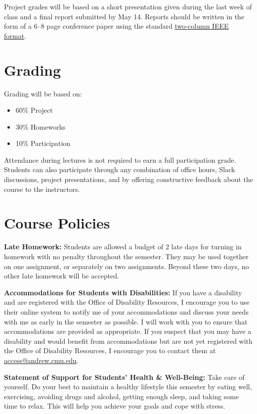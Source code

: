 \documentclass[11pt,letterpaper]{article}
\begin{document}
\medskip
\noindent
Project grades will be based on a short presentation given during the last week of class and a final report submitted by May 14. Reports should be written in the form of a 6--8 page conference paper using the standard \href{https://www.ieee.org/conferences/publishing/templates.html}{two-column IEEE format}.

\section*{Grading}

Grading will be based on:
\begin{itemize}
	\item 60\% Project
	\item 30\% Homeworks
	\item 10\% Participation
\end{itemize}
Attendance during lectures is not required to earn a full participation grade. Students can also participate through any combination of office hours, Slack discussions, project presentations, and by offering constructive feedback about the course to the instructors.


\section*{Course Policies}

\textbf{Late Homework:} Students are allowed a budget of 2 late days for turning in homework with no penalty throughout the semester. They may be used together on one assignment, or separately on two assignments. Beyond these two days, no other late homework will be accepted.

\medskip
\noindent
\textbf{Accommodations for Students with Disabilities:} If you have a disability and are registered with the Office of Disability Resources, I encourage you to use their online system to notify me of your accommodations and discuss your needs with me as early in the semester as possible. I will work with you to ensure that accommodations are provided as appropriate. If you suspect that you may have a disability and would benefit from accommodations but are not yet registered with the Office of Disability Resources, I encourage you to contact them at \href{mailto:access@andrew.cmu.edu}{access@andrew.cmu.edu}.

\medskip
\noindent
\textbf{Statement of Support for Students' Health \& Well-Being:} Take care of yourself. Do your best to maintain a healthy lifestyle this semester by eating well, exercising, avoiding drugs and alcohol, getting enough sleep, and taking some time to relax. This will help you achieve your goals and cope with stress.
\end{document}
